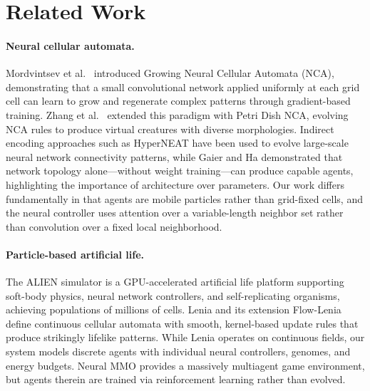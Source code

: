 \documentclass[10pt,twocolumn]{article}
\begin{document}
\section{Related Work}
\label{sec:related}

\paragraph{Neural cellular automata.}
Mordvintsev et al.\ \cite{mordvintsev2020growing} introduced Growing Neural Cellular Automata (NCA), demonstrating that a small convolutional network applied uniformly at each grid cell can learn to grow and regenerate complex patterns through gradient-based training.
Zhang et al.\ \cite{zhang2025petridish} extended this paradigm with Petri Dish NCA, evolving NCA rules to produce virtual creatures with diverse morphologies.
Indirect encoding approaches such as HyperNEAT \cite{stanley2009hypercube} have been used to evolve large-scale neural network connectivity patterns, while Gaier and Ha \cite{gaier2019weight} demonstrated that network topology alone---without weight training---can produce capable agents, highlighting the importance of architecture over parameters.
Our work differs fundamentally in that agents are mobile particles rather than grid-fixed cells, and the neural controller uses attention over a variable-length neighbor set rather than convolution over a fixed local neighborhood.

\paragraph{Particle-based artificial life.}
The ALIEN simulator \cite{alien2024} is a GPU-accelerated artificial life platform supporting soft-body physics, neural network controllers, and self-replicating organisms, achieving populations of millions of cells.
Lenia \cite{chan2019lenia} and its extension Flow-Lenia \cite{plantec2025flow} define continuous cellular automata with smooth, kernel-based update rules that produce strikingly lifelike patterns.
While Lenia operates on continuous fields, our system models discrete agents with individual neural controllers, genomes, and energy budgets.
Neural MMO \cite{suarez2023neural} provides a massively multiagent game environment, but agents therein are trained via reinforcement learning rather than evolved.
\end{document}
